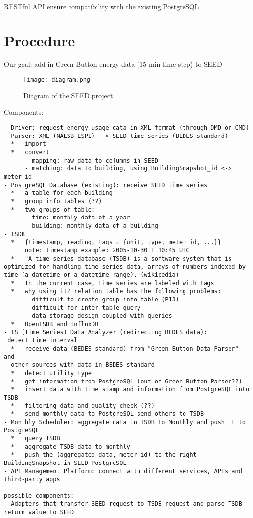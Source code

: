 \documentclass[hidelinks,12pt]{article}
\begin{document}
RESTful API ensure compatibility with the existing PostgreSQL
\section{Procedure}
Our goal: add in Green Button energy data (15-min time-step) to SEED

\begin{figure}[h!]
  \centering
  \texttt{[image: diagram.png]}
  \caption{Diagram of the SEED project~\cite{SEEDProjectPlan}}
  \label{fig:diagram}
\end{figure}

Components:
\begin{verbatim}
- Driver: request energy usage data in XML format (through DMD or CMD)
- Parser: XML (NAESB-ESPI) --> SEED time series (BEDES standard)
  *   import
  *   convert
      - mapping: raw data to columns in SEED
      - matching: data to building, using BuildingSnapshot_id <-> meter_id
- PostgreSQL Database (existing): receive SEED time series
  *   a table for each building
  *   group info tables (??)
  *   two groups of table: 
        time: monthly data of a year
        building: monthly data of a building
- TSDB
  *   {timestamp, reading, tags = {unit, type, meter_id, ...}}
      note: timestamp example: 2005-10-30 T 10:45 UTC
  *   "A time series database (TSDB) is a software system that is
optimized for handling time series data, arrays of numbers indexed by
time (a datetime or a datetime range)."(wikipedia)
  *   In the current case, time series are labeled with tags  
  *   why using it? relation table has the following problems:
        difficult to create group info table (P13)
        difficult for inter-table query
        data storage design coupled with queries
  *   OpenTSDB and InfluxDB
- TS (Time Series) Data Analyzer (redirecting BEDES data): 
 detect time interval
  *   receive data (BEDES standard) from "Green Button Data Parser" and
  other sources with data in BEDES standard
  *   detect utility type
  *   get information from PostgreSQL (out of Green Button Parser??)
  *   insert data with time stamp and information from PostgreSQL into TSDB
  *   filtering data and quality check (??)
  *   send monthly data to PostgreSQL send others to TSDB
- Monthly Scheduler: aggregate data in TSDB to Monthly and push it to PostgreSQL
  *   query TSDB
  *   aggregate TSDB data to monthly
  *   push the (aggregated data, meter_id) to the right BuildingSnapshot in SEED PostgreSQL
- API Management Platform: connect with different services, APIs and third-party apps

possible components: 
- Adapters that transfer SEED request to TSDB request and parse TSDB
return value to SEED
 
\end{verbatim}
\end{document}
